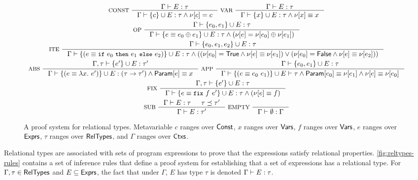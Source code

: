 \begin{figure}
  \centering
  \begin{gather*}
    \inference[ CONST ]{ %
      \Gamma \judges E : \tau }{ %
      \Gamma \judges \elts{ c } \union E : %
      \tau \land \resvar{c} = c }
    \inference[ VAR ]{ %
      \Gamma \judges E : \tau }{ %
      \Gamma \judges \elts{ x } \union E : %
      \tau \land \resvar{x} \equiv x } \\
    \inference[ OP ]{ 
      \Gamma \judges %
      \elts{ e_0, e_1 } \union E : \tau }{ %
      \Gamma \judges \elts{ e \equiv e_0 \oplus e_1 } \union E : %
      \tau \land (\resvar{e} = \resvar{e_0} \oplus \resvar{e_1}) } \\
    \inference[ ITE ]{ %
      \Gamma \judges %
      \elts{ e_0, e_1, e_2 } \union E : \tau }{ %
      \Gamma \judges \add{ %
        (e \equiv \ite{ e_0 }{ e_1 }{ e_2 }) }{ E } : %
      \tau \land ((\resvar{e_0} = \true \land %
      \resvar{e} \equiv \resvar{e_1}) \lor %
      (\resvar{e_0} = \false \land %
      \resvar{e} \equiv \resvar{e_2})) } \\
    \inference[ ABS ]{ \Gamma, \tau \judges %
      \add{ e' }{ E } : \tau' }{ %
      \Gamma \judges \add{ (e \equiv \lambda x.\ e') }{ E } : %
      (\tau \rightarrow \tau') \land \param{ e } \equiv x }
    \inference[ APP ]{ %
      \Gamma \judges \elts{ e_0, e_1 } \union E : \tau }{ %
      \Gamma \judges \add{ (e \equiv e_0\ e_1) }{ E } \judges %
      \tau \land \param{ e_0 } \equiv \resvar{ e_1 } \land %
      \resvar{e} \equiv \resvar{e_0} } \\
    \inference[ FIX ]{ %
      \Gamma, \tau \judges \add{ e' }{ E } : \tau }{ %
      \Gamma \judges \add{ e \equiv \fix{ f }{ e' } }{ E } : %
      \tau \land (\resvar{e} \equiv f) } \\
    \inference[ SUB ]{ %
      \Gamma \judges E : \tau & \tau \subtype \tau'
    }{ \Gamma \judges E : \tau' } 
    \inference[ EMPTY ]{ }{ %
      \Gamma \judges \emptyset : \Gamma } %
  \end{gather*}
  \caption{A proof system for relational types.
    Metavariable $c$ ranges over $\mathsf{Const}$, %
    $x$ ranges over $\mathsf{Vars}$, %
    $f$ ranges over $\mathsf{Vars}$, %
    $e$ ranges over $\mathsf{Exprs}$, %
    $\tau$ ranges over $\mathsf{RelTypes}$, and %
    $\Gamma$ ranges over $\mathsf{Ctxs}$. }
  \label{fig:reltypes-rules}
\end{figure}
%
%
Relational types are associated with sets of program expressions to
prove that the expressions satisfy relational properties.
%
\autoref{fig:reltypes-rules} contains a set of inference rules that
define a proof system for establishing that a set of expressions has a
relational type.
%
For $\Gamma, \tau \in \mathsf{RelTypes}$ and $E \subseteq \mathsf{Exprs}$, the fact
that under $\Gamma$, $E$ has type $\tau$ is denoted $\Gamma \vdash E
: \tau$.

